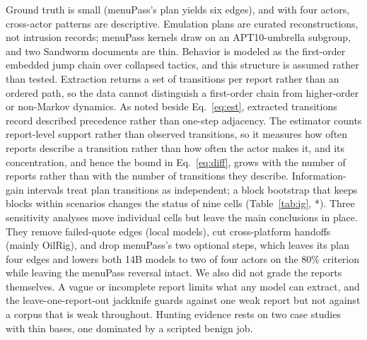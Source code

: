 \documentclass[letterpaper]{article} %
\begin{document}
Ground truth is small (menuPass's plan yields six edges), and with four actors, cross-actor patterns are descriptive. Emulation plans are curated reconstructions, not intrusion records; menuPass kernels draw on an APT10-umbrella subgroup, and two Sandworm documents are thin. Behavior is modeled as the first-order embedded jump chain over collapsed tactics, and this structure is assumed rather than tested. Extraction returns a set of transitions per report rather than an ordered path, so the data cannot distinguish a first-order chain from higher-order or non-Markov dynamics. As noted beside Eq.~\eqref{eq:est}, extracted transitions record described precedence rather than one-step adjacency. The estimator counts report-level support rather than observed transitions, so it measures how often reports describe a transition rather than how often the actor makes it, and its concentration, and hence the bound in Eq.~\eqref{eq:diff}, grows with the number of reports rather than with the number of transitions they describe. Information-gain intervals treat plan transitions as independent; a block bootstrap that keeps blocks within scenarios changes the status of nine cells (Table~\ref{tab:ig}, *). Three sensitivity analyses move individual cells but leave the main conclusions in place. They remove failed-quote edges (local models), cut cross-platform handoffs (mainly OilRig), and drop menuPass's two optional steps, which leaves its plan four edges and lowers both 14B models to two of four actors on the 80\% criterion while leaving the menuPass reversal intact. We also did not grade the reports themselves. A vague or incomplete report limits what any model can extract, and the leave-one-report-out jackknife guards against one weak report but not against a corpus that is weak throughout. Hunting evidence rests on two case studies with thin bases, one dominated by a scripted benign job.
\end{document}
